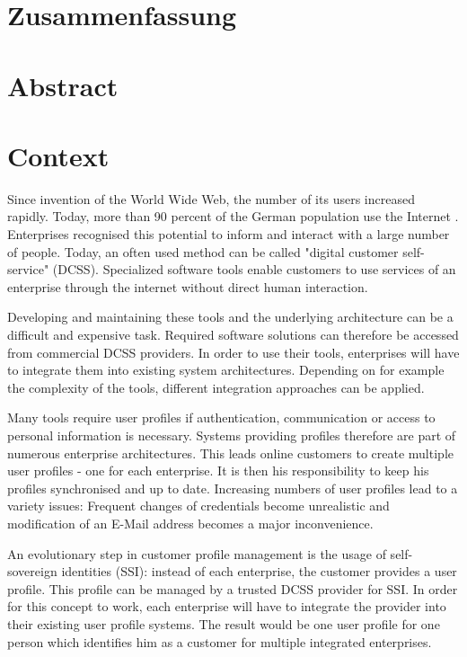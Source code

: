 \documentclass[
     12pt,         %
     a4paper,      %
     BCOR=10mm,version=first,     %
     DIV=14,version=first,        %
     ]{scrreprt}
\begin{document}
\chapter*{Zusammenfassung}

\newpage

\chapter*{Abstract}

\newpage

\tableofcontents
\cleardoublepage
{}

\chapter{Context}

Since invention of the World Wide Web, the number of its users increased rapidly. Today, more than 90 percent of the German population use the Internet \cite{Onlinestudie}. Enterprises recognised this potential to inform and interact with a large number of people. Today, an often used method can be called "digital customer self-service" (DCSS). Specialized software tools enable customers to use services of an enterprise through the internet without direct human interaction.

Developing and maintaining these tools and the underlying architecture can be a difficult and expensive task. Required software solutions can therefore be accessed from commercial DCSS providers. In order to use their tools, enterprises will have to integrate them into existing system architectures. Depending on for example the complexity of the tools, different integration approaches can be applied.

Many tools require user profiles if authentication, communication or access to personal information is necessary. Systems providing profiles therefore are part of numerous enterprise architectures. This leads online customers to create multiple user profiles - one for each enterprise. It is then his responsibility to keep his profiles synchronised and up to date. Increasing numbers of user profiles lead to a variety issues: Frequent changes of credentials become unrealistic and modification of an E-Mail address becomes a major inconvenience.

An evolutionary step in customer profile management is the usage of self-sovereign identities (SSI): instead of each enterprise, the customer provides a user profile. This profile can be managed by a trusted DCSS provider for SSI. In order for this concept to work, each enterprise will have to integrate the provider into their existing user profile systems. The result would be one user profile for one person which identifies him as a customer for multiple integrated enterprises.
\end{document}
